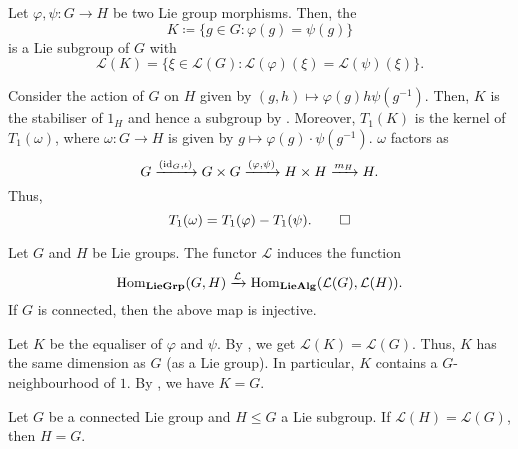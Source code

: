 \documentclass[12pt]{article}
\begin{document}
\begin{lem} \label{lem:equaliser-subgroup-tangent-space}
	Let $\varphi, \psi \colon G \to H$ be two Lie group morphisms. Then, the 
	\begin{equation*} 
		K \coloneqq \{g \in G : \varphi(g) = \psi(g)\}
	\end{equation*}
	is a Lie subgroup of $G$ with
	\begin{equation*} 
		\mathcal{L}(K) = \{\xi \in \mathcal{L}(G) : \mathcal{L}(\varphi)(\xi) = \mathcal{L}(\psi)(\xi)\}.
	\end{equation*}
\end{lem}
\begin{sketch} 
	Consider the action of $G$ on $H$ given by $(g, h) \mapsto \varphi(g) h \psi(g^{-1})$. 
	Then, $K$ is the stabiliser of $1_{H}$ and hence a subgroup by . 
	Moreover, $T_{1}(K)$ is the kernel of $T_{1}(\omega)$, where $\omega \colon G \to H$ is given by $g \mapsto \varphi(g) \cdot \psi(g^{-1})$. 
	$\omega$ factors as
	\begin{equation*} 
		G \xrightarrow{(\operatorname{id}_{G}, \iota)} G \times G \xrightarrow{(\varphi, \psi)} H \times H \xrightarrow{m_{H}} H.
	\end{equation*}
	Thus,
	\begin{equation*} 
		T_{1}(\omega) = T_{1}(\varphi) - T_{1}(\psi). \qedhere
	\end{equation*}
\end{sketch}

\begin{thm} \label{thm:connected-group-L-functor-injective}
	Let $G$ and $H$ be Lie groups. The functor $\mathcal{L}$ induces the function
	\begin{equation*} 
		\operatorname{Hom}_{\mathbf{LieGrp}}(G, H) \xrightarrow{\mathcal{L}} \operatorname{Hom}_{\mathbf{LieAlg}}(\mathcal{L}(G), \mathcal{L}(H)).
	\end{equation*}
	If $G$ is connected, then the above map is injective.
\end{thm}
\begin{sketch} 
	Let $K$ be the equaliser of $\varphi$ and $\psi$. 
	By , we get $\mathcal{L}(K) = \mathcal{L}(G)$. 
	Thus, $K$ has the same dimension as $G$ (as a Lie group). 
	In particular, $K$ contains a $G$-neighbourhood of $1$. 
	By , we have $K = G$.
\end{sketch}

\begin{por} \label{por:connected-lie-subgroup-equal-lie-algebra}
	Let $G$ be a connected Lie group and $H \le G$ a Lie subgroup. 
	If $\mathcal{L}(H) = \mathcal{L}(G)$, then $H = G$.
\end{por}
\end{document}
